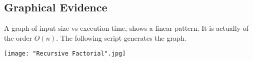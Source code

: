 \documentclass[a4paper, 12pt]{article}
\begin{document}
\subsection*{Graphical Evidence}
\begin{flushleft}
A graph of input size vs execution time, shows a linear pattern. It is actually of the order $O(n)$. The following script generates the graph.
\end{flushleft}

\begin{center}
		\texttt{[image: "Recursive Factorial".jpg]}
	\end{center}
	
\end{document}
